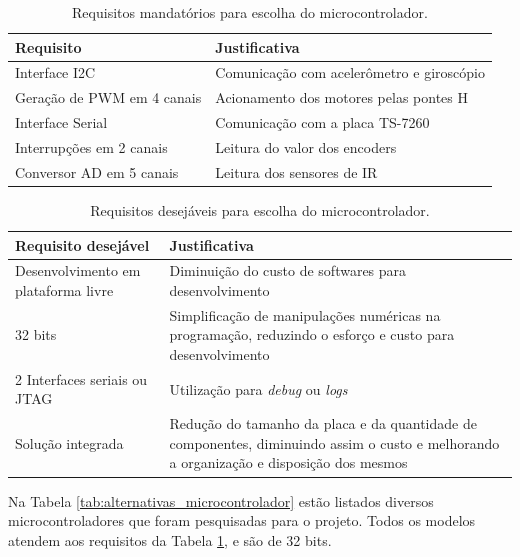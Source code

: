 \begin{table}[h]
  \caption{Requisitos mandatórios para escolha do microcontrolador.}
  \centering
  \begin{tabular}{p{7cm}|p{8cm}}
    \toprule
    \textbf{Requisito} & \textbf{Justificativa} \\
    \hline
    Interface I2C & Comunicação com acelerômetro e giroscópio \\
    \hline
    Geração de PWM em 4 canais & Acionamento dos motores pelas pontes H \\
    \hline
    Interface Serial	 & Comunicação com a placa TS-7260 \\
    \hline
    Interrupções em 2 canais	 & Leitura do valor dos encoders \\
    \hline
    Conversor AD em 5 canais	 & Leitura dos sensores de IR \\
    \bottomrule
  \end{tabular}
  \label{tab:requisitos_microcontrolador}
\end{table}

\begin{table}[h]
  \caption{Requisitos desejáveis para escolha do microcontrolador.}
  \centering
  \begin{tabular}{p{7cm}|p{8cm}}
    \toprule
    \textbf{Requisito desejável} & \textbf{Justificativa} \\
    \hline
    Desenvolvimento em plataforma livre	 & Diminuição do custo de softwares para desenvolvimento \\
    \hline
    32 bits & Simplificação de manipulações numéricas na programação, reduzindo o esforço e custo para desenvolvimento \\
    \hline
    2 Interfaces seriais ou JTAG & Utilização para \textit{debug} ou \textit{logs} \\
    \hline
    Solução integrada & Redução do tamanho da placa e da quantidade de componentes, diminuindo assim o custo e melhorando a organização e disposição dos mesmos \\
    \bottomrule
  \end{tabular}
  \label{tab:requisitos_desejaveis_microcontrolador}
\end{table}

Na Tabela \ref{tab:alternativas_microcontrolador} estão listados diversos microcontroladores que foram pesquisadas para o projeto. Todos os modelos atendem aos requisitos da Tabela \ref{tab:requisitos_microcontrolador}, e são de 32 bits.

